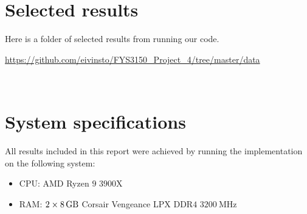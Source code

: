 \documentclass[reprint,english,notitlepage]{revtex4-1}  %
\begin{document}
\newpage
\section{Selected results} \label{B}
Here is a folder of selected results from running our code.

\url{https://github.com/eivinsto/FYS3150_Project_4/tree/master/data}

~
\newpage
\section{System specifications} \label{C}
All results included in this report were achieved by running the implementation on the following system:

\begin{itemize}
	\item CPU: AMD Ryzen \(9\) \(3900\)X
	\item RAM: \(2\times\SI{8}{\giga\byte}\) Corsair Vengeance LPX DDR\(4\) \(\SI{3200}{\mega\hertz}\)
\end{itemize}
\end{document}
